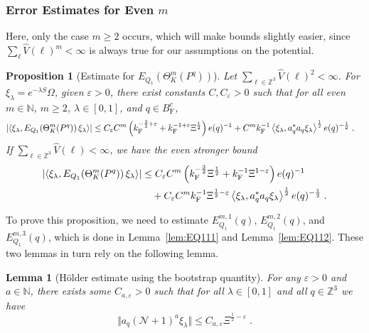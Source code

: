 \documentclass[12pt,a4paper]{article}
\numberwithin{equation}{section}
\newcommand{\cN}{\mathcal{N}}
\newcommand{\NNN}{\mathbb{N}}
\newcommand{\1}{\mathbb{I}}
\newcommand{\F}{\mathrm{F}}
\newcommand{\kF}{k_\F}
\newcommand{\Zstar}{\mathbb{Z}^3} %
\newcommand{\N}{\mathbb{N}}
\newcommand{\Z}{\mathbb{Z}}
\newcommand{\half}{\frac{1}{2}}
\newcommand{\eva}[1]{\left\langle #1 \right\rangle}
\theoremstyle{plain}
\newtheorem{lemma}[theorem]{Lemma}
\newtheorem{proposition}[theorem]{Proposition}
\theoremstyle{definition}
\theoremstyle{remark}
\theoremstyle{plain}
\theoremstyle{definition}
\theoremstyle{remark}
\begin{document}
\subsubsection{Error Estimates for Even $m$}

Here, only the case $ m \ge 2 $ occurs, which will make bounds slightly easier, since $ \sum_\ell \hat{V}(\ell)^m < \infty $ is always true for our assumptions on the potential.

\begin{proposition}[Estimate for $E_{Q_1}(\Theta^m_{K}(P^q))$]\label{prop:finEQ1est}
Let $ \sum_{\ell \in \Zstar} \hat{V}(\ell)^2 < \infty $. For $\xi_\lambda = e^{-\lambda S} \Omega$, given $ \varepsilon > 0 $, there exist constants $ C, C_\varepsilon > 0 $ such that for all even $ m \in \NNN $, $ m \ge 2 $, $ \lambda \in [0,1] $, and $ q \in B_{\F}^c $,
\begin{align} \label{eq:finalEQ1est_Coulomb}
	\abs{\eva{\xi_\lambda, E_{Q_1}\!\left(\Theta^m_K(P^q)\right) \xi_\lambda}}
	&\leq C_\varepsilon C^m \left( \kF^{-\frac 32 + \varepsilon}
		+ \kF^{-1 + \varepsilon} \Xi^\half \right)
		e(q)^{-1}
		+ C^m \kF^{-1} \eva{\xi_\lambda, a_q^* a_q \xi_\lambda}^{\half} e(q)^{-\half} \;.
\end{align}
If $ \sum_{\ell \in \Zstar} \hat{V}(\ell) < \infty $, we have the even stronger bound
\begin{align} \label{eq:finalEQ1est}
	\abs{\eva{\xi_\lambda, E_{Q_1}\!\left(\Theta^m_K(P^q)\right) \xi_\lambda}}
	&\leq C_\varepsilon C^m \left(
		\kF^{-\frac{3}{2}} \Xi^\half
		+ \kF^{-1}\Xi^{1-\varepsilon} \right) e(q)^{-1} \nonumber\\
	&\quad + C_\varepsilon C^m \kF^{-1} \Xi^{\half - \varepsilon} \eva{\xi_\lambda, a_q^* a_q \xi_\lambda}^{\half} e(q)^{-\half} \;.
\end{align}
\end{proposition}

To prove this proposition, we need to estimate $ E^{m,1}_{Q_1}(q) $, $ E^{m,2}_{Q_1}(q) $, and $ E^{m,3}_{Q_1}(q) $, which is done in Lemma~\ref{lem:EQ111} and Lemma~\ref{lem:EQ112}. These two lemmas in turn rely on the following lemma.

\begin{lemma}[H\"older estimate using the bootstrap quantity] \label{lem:Xi_halfminusepsilon}
For any $ \varepsilon > 0 $ and $ a \in \N $, there exists some $ C_{a,\varepsilon} > 0 $ such that for all $ \lambda \in [0,1] $ and all $ q \in \Z^3 $ we have
\begin{equation} \label{eq:Xi_halfminusepsilon}
	\Vert a_q (\cN + 1)^a \xi_\lambda \Vert
	\le C_{a,\varepsilon} \Xi^{\half-\varepsilon} \;.
\end{equation}
\end{lemma}
\end{document}
